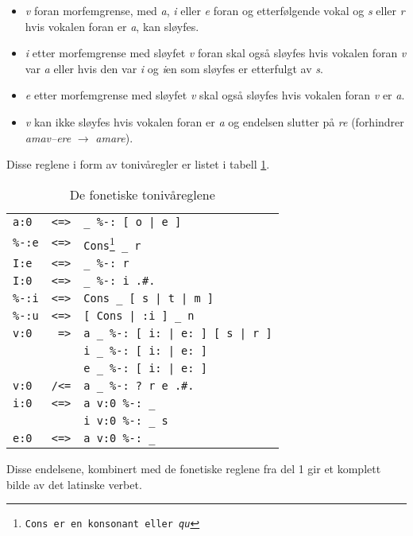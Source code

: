 \documentclass[a4paper]{article}
\begin{document}
\begin{itemize}
\item \emph{v} foran morfemgrense, med \emph{a}, \emph{i} eller \emph{e} foran
og etterf\o{}lgende vokal og \emph{s} eller \emph{r} hvis vokalen foran er
\emph{a}, kan sl\o{}yfes.

\item \emph{i} etter morfemgrense med sl\o{}yfet \emph{v} foran skal ogs\aa{}
sl\o{}yfes hvis vokalen foran \emph{v} var \emph{a} eller hvis den var
\emph{i} og \emph{i}en som sl\o{}yfes er etterfulgt av \emph{s}.

\item \emph{e} etter morfemgrense med sl\o{}yfet \emph{v} skal ogs\aa{}
sl\o{}yfes hvis vokalen foran \emph{v} er \emph{a}.

\item \emph{v} kan ikke sl\o{}yfes hvis vokalen foran er \emph{a} og endelsen
slutter p\aa{} \emph{re} (forhindrer \emph{amav--ere} $\to$ \emph{amare}).
\end{itemize}

Disse reglene i form av toniv\aa{}regler er listet i tabell \ref{twolc}.

\begin{table}[hp]
\begin{minipage}{\textwidth}
\begin{center}
\begin{tabular}{rcl}
\texttt{a:0  } & \texttt{<=>} & \texttt{\_ \%-: [ o | e ]} \\
\texttt{\%-:e} & \texttt{<=>} & \texttt{Cons\footnote{\texttt{Cons} er en konsonant eller \emph{qu} } \_ r} \\
\texttt{I:e  } & \texttt{<=>} & \texttt{\_ \%-: r} \\
\texttt{I:0  } & \texttt{<=>} & \texttt{\_ \%-: i .\#.} \\
\texttt{\%-:i} & \texttt{<=>} & \texttt{Cons \_ [ s | t | m ]} \\
\texttt{\%-:u} & \texttt{<=>} & \texttt{[ Cons | :i ] \_ n} \\
\texttt{v:0  } & \texttt{ =>} & \texttt{a \_ \%-: [ i: | e: ] [ s | r ]} \\
\texttt{     } & \texttt{   } & \texttt{i \_ \%-: [ i: | e: ]} \\
\texttt{     } & \texttt{   } & \texttt{e \_ \%-: [ i: | e: ]} \\
\texttt{v:0  } & \texttt{/<=} & \texttt{a \_ \%-: ? r e .\#.} \\
\texttt{i:0  } & \texttt{<=>} & \texttt{a v:0 \%-: \_} \\
\texttt{     } & \texttt{   } & \texttt{i v:0 \%-: \_ s} \\
\texttt{e:0  } & \texttt{<=>} & \texttt{a v:0 \%-: \_} \\
\end{tabular}
\end{center}
\end{minipage}
\caption{De fonetiske toniv\aa{}reglene}
\label{twolc}
\end{table}

Disse endelsene, kombinert med de fonetiske reglene fra del 1 gir et komplett
bilde av det latinske verbet.


{}
\end{document}
